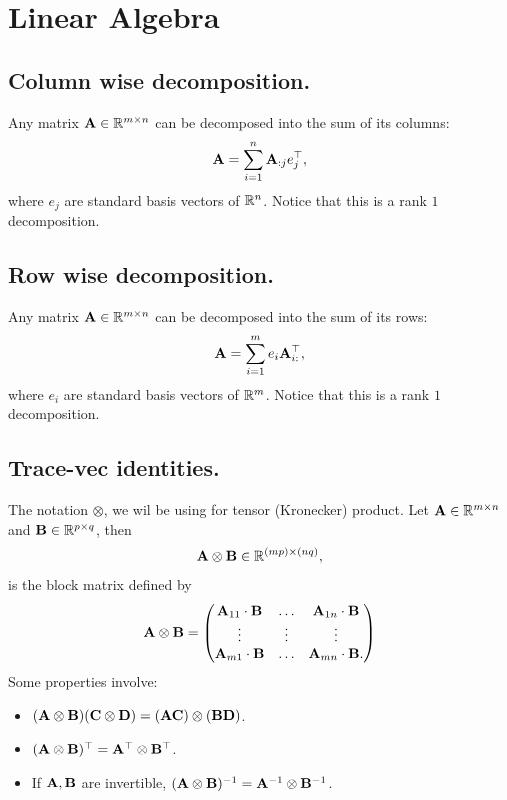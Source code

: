 \documentclass[11pt]{article}  %
\begin{document}
\tableofcontents

\section{Linear Algebra}


\subsection{Column wise decomposition.}
Any matrix $\mathbf{A} \in \mathbb{R}^{m \times n}$ can be decomposed into the sum of its columns: 
\begin{align}
	\mathbf{A} = \sum_{i=1}^{n} \mathbf{A}_{:j} e_j^{\top},
\end{align}
where $e_j$ are standard basis vectors of $\mathbb{R}^n$.
Notice that this is a rank $1$ decomposition.

\subsection{Row wise decomposition.}
Any matrix $\mathbf{A} \in \mathbb{R}^{m \times n}$ can be decomposed into the sum of its rows: 
\begin{align}
	\mathbf{A} = \sum_{i=1}^{m} e_i \mathbf{A}_{i:}^{\top},
\end{align}
where $e_i$ are standard basis vectors of $\mathbb{R}^m$.
Notice that this is a rank $1$ decomposition.

\subsection{Trace-vec identities.}
The notation $\otimes$, we wil be using for tensor (Kronecker) product.
Let $\mathbf{A} \in \mathbb{R}^{m \times n}$ and $\mathbf{B} \in \mathbb{R}^{p \times q}$, then 
\begin{align*}
  \mathbf{A} \otimes \mathbf{B} \in \mathbb{R}^{(mp) \times (nq)},
\end{align*}
is the block matrix defined by 
\begin{align*}
  \mA \otimes \mB = \begin{pmatrix*}
    \mA_{11} \cdot \mB & \hdots & \mA_{1n} \cdot \mB \\
    \vdots & \vdots & \vdots \\
    \mA_{m1} \cdot \mB & \hdots & \mA_{mn} \cdot \mB.
  \end{pmatrix*}
\end{align*}
Some properties involve: 
\begin{itemize}
  \item $(\mathbf{A} \otimes \mathbf{B})(\mathbf{C} \otimes \mathbf{D}) = (\mathbf{A}\mathbf{C})\otimes(\mathbf{B}\mathbf{D})$.
  \item $(\mathbf{A} \otimes \mathbf{B})^{\top} = \mathbf{A}^{\top} \otimes \mathbf{B}^{\top}$.
  \item If $\mathbf{A}, \mathbf{B}$ are invertible, $(\mathbf{A} \otimes \mathbf{B})^{-1} = \mathbf{A}^{-1} \otimes \mathbf{B}^{-1}$. 
\end{itemize}
\end{document}
